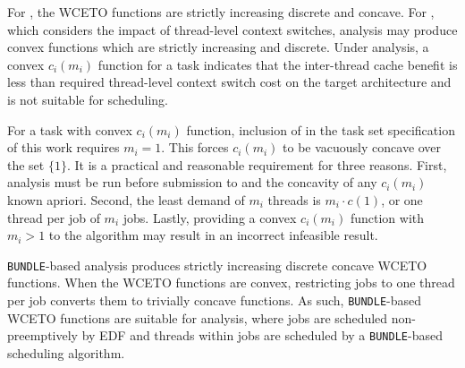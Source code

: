 For \bundle{}, the WCETO functions are strictly increasing discrete
and concave. For \bundlep{}, which considers the impact of
thread-level context switches, analysis may produce convex functions
which are strictly increasing and discrete. Under \bundlep{} analysis,
a convex ${c_i(m_i)}$ function for a task  indicates that the
inter-thread cache benefit is less than required thread-level context
switch cost on the target architecture and is not suitable for
\bundlep{} scheduling.

For a task  with convex ${c_i(m_i)}$ function, inclusion of
 in the task set specification of this work requires ${m_i =
  1}$. This forces ${c_i(m_i)}$ to be vacuously concave over the set
${\{1\}}$. It is a practical and reasonable requirement for three
reasons. First, \bundlep{} analysis must be run before submission to
\tpj{} and the concavity of any ${c_i(m_i)}$ known apriori. Second, the
least demand of ${m_i}$ threads is ${m_i \cdot c(1)}$, or one thread
per job of ${m_i}$ jobs. Lastly, providing a convex ${c_i(m_i)}$
function with ${m_i > 1}$ to the \tpj{} algorithm may result in an
incorrect infeasible result.

\texttt{BUNDLE}-based analysis produces strictly increasing discrete
concave WCETO functions. When the WCETO functions are convex,
restricting jobs to one thread per job converts them to trivially
concave functions. As such, \texttt{BUNDLE}-based WCETO functions are
suitable for \tpj{} analysis, where jobs are scheduled
non-preemptively by EDF and threads within jobs are scheduled by a
\texttt{BUNDLE}-based scheduling algorithm. 
